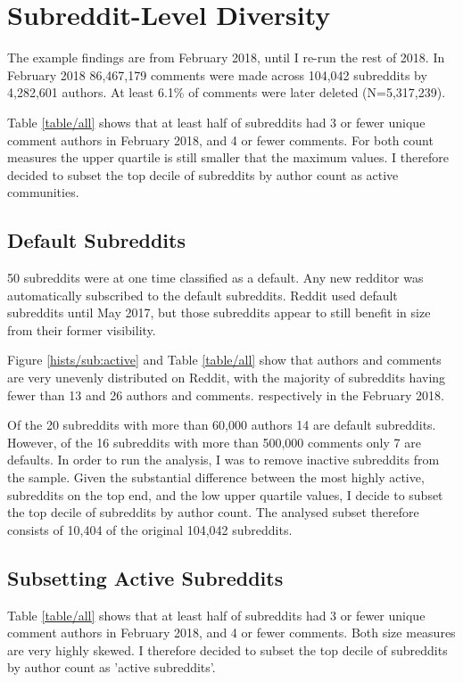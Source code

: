 \section{Subreddit-Level Diversity} \label{subreddit-diversity}

The example findings are from February 2018, until I re-run the rest of 2018. In February 2018 86,467,179 comments were made across 104,042 subreddits by 4,282,601 authors. At least 6.1\% of comments were later deleted (N=5,317,239).

Table \ref{table/all} shows that at least half of subreddits had 3 or fewer unique comment authors in February 2018, and 4 or fewer comments. For both count measures the upper quartile is still smaller that the maximum values. I therefore decided to subset the top decile of subreddits by author count as active communities.


\subsection{Default Subreddits}
50 subreddits were at one time classified as a default. Any new redditor was automatically subscribed to the default subreddits. Reddit used default subreddits until May 2017, but those subreddits appear to still benefit in size from their former visibility.

Figure \ref{hists/sub:active} and Table \ref{table/all} show that authors and comments are very unevenly distributed on Reddit, with the majority of subreddits having fewer than 13 and 26 authors and comments. respectively in the February 2018.

Of the 20 subreddits with more than 60,000 authors 14 are default subreddits. However, of the 16 subreddits with more than 500,000 comments only 7 are defaults. In order to run the analysis, I was to remove inactive subreddits from the sample. Given the substantial difference between the most highly active, subreddits on the top end, and the low upper quartile values, I decide to subset the top decile of subreddits by author count. The analysed subset therefore consists of 10,404 of the original 104,042 subreddits.


 \label{hists/sub:active}





\subsection{Subsetting Active Subreddits}
Table \ref{table/all} shows that at least half of subreddits had 3 or fewer unique comment authors in February 2018, and 4 or fewer comments. Both size measures are very highly skewed. I therefore decided to subset the top decile of subreddits by author count as 'active subreddits'.

